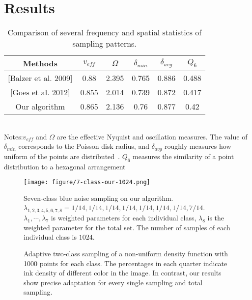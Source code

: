 \section{Results}

\begin{table}
\caption{\label{comparing-table}
Comparison of several frequency and spatial statistics of sampling patterns.
}

 \begin{tabular}{c|c|c|c|c|c}

  \hline
   Methods & $v_{eff}$ & $\Omega$ & $\delta_{min}$ & $\delta_{avg}$ & $Q_6$ \\ \hline
  {[Balzer et al. 2009]}& 0.88& 2.395 & 0.765 & 0.886 & 0.488 \\
  {[Goes et al. 2012]} & 0.855 & 2.014 & 0.739 & 0.872 & 0.417 \\
   Our algorithm & 0.865 & 2.136 & 0.76 & 0.877 & 0.42 \\ \hline
  \end{tabular}\\
  Notes:$v_{eff} $ and $\Omega$ are the effective Nyquist and oscillation measures.
The value of $\delta_{min}$ corresponds to the Poisson disk radius,
and $\delta_{avg}$ roughly measures how uniform of the points are distributed~\cite{schlomer:2011:farthest}.
$Q_6$ measures the similarity of a point distribution to a hexagonal arrangement~\cite{kansal:2000:nonequilibrium}
\end{table}

\begin{figure*}[htb]
  \centering
  \texttt{[image: figure/7-class-our-1024.png]}

  \caption{Seven-class blue noise sampling on our algorithm.
  $\lambda_{1,2,3,4,5,6,7,8}=1/14,1/14,1/14,1/14,1/14,1/14,1/14,7/14$.
  $\lambda_1,\cdots,\lambda_7$ is weighted parameters for each individual class,
  $\lambda_8$ is the weighted parameter for the total set.
  The number of samples of each individual class is $1024$.}\label{seven-class-sampling}
\end{figure*}

\begin{figure}[htb]
  \centering
  \caption{Adaptive two-class sampling of a non-uniform density function with 1000 points for each class.
  The percentages in each quarter indicate ink density of different color in the image. In contrast,
  our results show precise adaptation for every single sampling and total sampling.}\label{adaptive sampling}
\end{figure}

